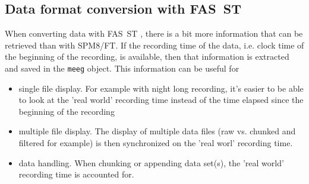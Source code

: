 \documentclass[a4paper,titlepage]{article}
\def\dblS{\hbox{S\hskip -4.5pt S}}
\def\dblSt{\hbox{S\hskip -6pt S}}
\newcommand{\bi}{\begin{itemize}}
\newcommand{\ei}{\end{itemize}}
\newcommand{\fasst}{FA\dblS T } 	%
\newcommand{\tfasst}{FA\dblSt T } %
\begin{document}


\subsection{Data format conversion with \tfasst}
\label{sec:dataconvert}

When converting data with \fasst, there is a bit more information that can be retrieved than with SPM8/FT. If the recording time of the data, i.e. clock time of the beginning of the recording, is available, then that information is extracted and saved in the {\tt meeg} object. This information can be useful for
\bi
\item single file display. For example with night long recording, it's easier to be able to look at the 'real world' recording time instead of the time elapsed since the beginning of the recording
\item multiple file display. The display of multiple data files (raw vs. chunked and filtered for example) is then synchronized on the 'real worl' recording time.
\item data handling. When chunking or appending data set(s), the 'real world' recording time is accounted for.
\ei
\end{document}
